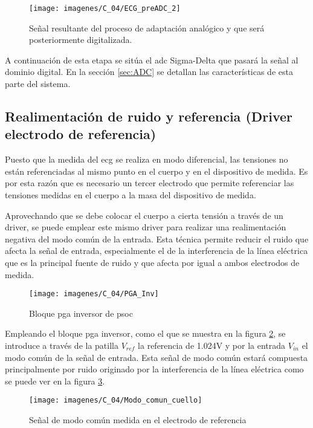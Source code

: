 \begin{figure}[!ht]
	\center
	\texttt{[image: imagenes/C\_04/ECG\_preADC\_2]}
	\caption{Señal resultante del proceso de adaptación analógico y que será posteriormente digitalizada.}
	\label{fig:preADC}
\end{figure}

A continuación de esta etapa se sitúa el \acrshort{adc} Sigma-Delta que pasará la señal al dominio digital. En la sección \ref{sec:ADC} se detallan las características de esta parte del sistema.

\subsection{Realimentación de ruido y referencia (Driver electrodo de referencia)}
Puesto que la medida del \acrshort{ecg} se realiza en modo diferencial, las tensiones no están referenciadas al mismo punto en el cuerpo y en el dispositivo de medida. Es por esta razón que es necesario un tercer electrodo que permite referenciar las tensiones medidas en el cuerpo a la masa del dispositivo de medida.

Aprovechando que se debe colocar el cuerpo a cierta tensión a través de un driver, se puede emplear este mismo driver para realizar una realimentación negativa del modo común de la entrada. Esta técnica permite reducir el ruido que afecta la señal de entrada, especialmente el de la interferencia de la línea eléctrica que es la principal fuente de ruido y que afecta por igual a ambos electrodos de medida.


\begin{figure}[!ht]
	\center
	\texttt{[image: imagenes/C\_04/PGA\_Inv]}
	\caption{Bloque \acrshort{pga} inversor de \acrshort{psoc}}
	\label{fig:PGA_inv}
\end{figure}

Empleando el bloque \acrshort{pga} inversor, como el que se muestra en la figura \ref{fig:PGA_inv}, se introduce a través de la patilla $V_{ref}$ la referencia de  1.024V y por la entrada $V_{in}$ el modo común de la señal de entrada. Esta señal de modo común estará compuesta principalmente por ruido originado por la interferencia de la línea eléctrica como se puede ver en la figura \ref{fig:com_mode}.

\begin{figure}[!ht]
	\center
	\texttt{[image: imagenes/C\_04/Modo\_comun\_cuello]}
	\caption{Señal de modo común medida en el electrodo de referencia}
	\label{fig:com_mode}
\end{figure}

